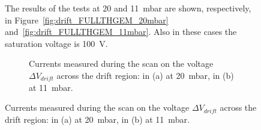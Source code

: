 \documentclass[a4paper, 11 pt]{article}
\newcommand{\Vdrift}{$ \Delta V_{drift}$}
\begin{document}
\begin{figure}[htbp]
The results of the tests at 20 and 11~mbar are shown, respectively, in Figure~\ref{fig:drift_FULLTHGEM_20mbar} and~\ref{fig:drift_FULLTHGEM_11mbar}.
Also in these cases the saturation voltage is 100~V.



\begin{figure}[!htb]
	\centering
	\caption{Currents measured during the scan on the voltage \Vdrift{} across the drift region: in (a) at 20~mbar, in (b) at 11~mbar.}
	\label{fig:drift_FULLTHGEM_other_pressure}
\end{figure}




\end{figure}
\end{document}
